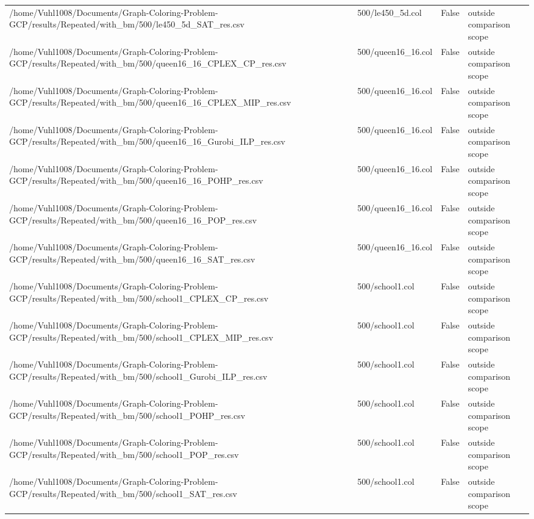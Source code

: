 \begin{table}[htbp]
\begin{tabular}{llll}
/home/Vuhl1008/Documents/Graph-Coloring-Problem-GCP/results/Repeated/with\_bm/500/le450\_5d\_SAT\_res.csv & 500/le450\_5d.col & False & outside comparison scope \\
/home/Vuhl1008/Documents/Graph-Coloring-Problem-GCP/results/Repeated/with\_bm/500/queen16\_16\_CPLEX\_CP\_res.csv & 500/queen16\_16.col & False & outside comparison scope \\
/home/Vuhl1008/Documents/Graph-Coloring-Problem-GCP/results/Repeated/with\_bm/500/queen16\_16\_CPLEX\_MIP\_res.csv & 500/queen16\_16.col & False & outside comparison scope \\
/home/Vuhl1008/Documents/Graph-Coloring-Problem-GCP/results/Repeated/with\_bm/500/queen16\_16\_Gurobi\_ILP\_res.csv & 500/queen16\_16.col & False & outside comparison scope \\
/home/Vuhl1008/Documents/Graph-Coloring-Problem-GCP/results/Repeated/with\_bm/500/queen16\_16\_POHP\_res.csv & 500/queen16\_16.col & False & outside comparison scope \\
/home/Vuhl1008/Documents/Graph-Coloring-Problem-GCP/results/Repeated/with\_bm/500/queen16\_16\_POP\_res.csv & 500/queen16\_16.col & False & outside comparison scope \\
/home/Vuhl1008/Documents/Graph-Coloring-Problem-GCP/results/Repeated/with\_bm/500/queen16\_16\_SAT\_res.csv & 500/queen16\_16.col & False & outside comparison scope \\
/home/Vuhl1008/Documents/Graph-Coloring-Problem-GCP/results/Repeated/with\_bm/500/school1\_CPLEX\_CP\_res.csv & 500/school1.col & False & outside comparison scope \\
/home/Vuhl1008/Documents/Graph-Coloring-Problem-GCP/results/Repeated/with\_bm/500/school1\_CPLEX\_MIP\_res.csv & 500/school1.col & False & outside comparison scope \\
/home/Vuhl1008/Documents/Graph-Coloring-Problem-GCP/results/Repeated/with\_bm/500/school1\_Gurobi\_ILP\_res.csv & 500/school1.col & False & outside comparison scope \\
/home/Vuhl1008/Documents/Graph-Coloring-Problem-GCP/results/Repeated/with\_bm/500/school1\_POHP\_res.csv & 500/school1.col & False & outside comparison scope \\
/home/Vuhl1008/Documents/Graph-Coloring-Problem-GCP/results/Repeated/with\_bm/500/school1\_POP\_res.csv & 500/school1.col & False & outside comparison scope \\
/home/Vuhl1008/Documents/Graph-Coloring-Problem-GCP/results/Repeated/with\_bm/500/school1\_SAT\_res.csv & 500/school1.col & False & outside comparison scope \\

\end{tabular}
\end{table}

